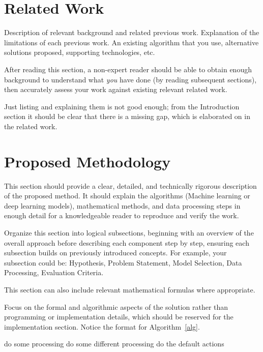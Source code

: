 \documentclass{article}
\begin{document}
\section{Related Work}
Description of relevant background and related previous work. Explanation of the limitations of each previous work. An existing algorithm that you use, alternative solutions proposed, supporting technologies, etc. 

After reading this section, a non-expert reader should be able to obtain enough background to understand what \emph{you} have done (by reading subsequent sections), then accurately assess your work against existing relevant related work. 

Just listing and explaining them is not good enough; from the Introduction section it should be clear that there is a missing gap, which is elaborated on in the related work.

\section{Proposed Methodology}
This section should provide a clear, detailed, and technically rigorous description of the proposed method. It should explain the algorithms (Machine learning or deep learning models), mathematical methods, and data processing steps in enough detail for a knowledgeable reader to reproduce and verify the work. 

Organize this section into logical subsections, beginning with an overview of the overall approach before describing each component step by step, ensuring each subsection builds on previously introduced concepts. For example, your subsection could be: Hypothesis, Problem Statement, Model Selection, Data Processing, Evaluation Criteria. 

This section can also include relevant mathematical formulas where appropriate. 

Focus on the formal and algorithmic aspects of the solution rather than programming or implementation details, which should be reserved for the implementation section. Notice the format for Algorithm~\ref{alg}. 

\begin{algorithm}
    \begin{algorithmic}
            \STATE do some processing
            \STATE do some different processing
        \ELSE
            \STATE do the default actions
        \ENDIF
    \end{algorithmic}
\caption{This is an example algorithm.}
\label{alg}
\end{algorithm}
\end{document}
